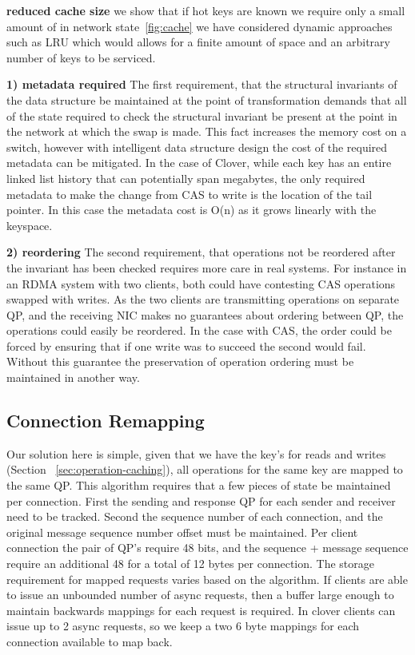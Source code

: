 \textbf{reduced cache size} we show that if hot keys are known we require only a
small amount of in network state~\ref{fig:cache} we have considered dynamic
approaches such as LRU which would allows for a finite amount of space and an
arbitrary number of keys to be serviced.

 

\textbf{1) metadata required} The first requirement, that the structural invariants
of the data structure be maintained at the point of transformation demands that
all of the state required to check the structural invariant be present at the
point in the network at which the swap is made. This fact increases the memory
cost on a switch, however with intelligent data structure design the cost of the
required metadata can be mitigated. In the case of Clover, while each key has
an entire linked list history that can potentially span megabytes, the only
required metadata to make the change from CAS to write is the location of the
tail pointer. In this case the metadata cost is O(n) as it grows linearly with
the keyspace.

\textbf{2) reordering} The second requirement, that operations not be reordered
after the invariant has been checked requires more care in real systems. For
instance in an RDMA system with two clients, both could have contesting CAS
operations swapped with writes. As the two clients are transmitting operations on
separate QP, and the receiving NIC makes no guarantees about ordering between QP,
the operations could easily be reordered. In the case with CAS, the order could
be forced by ensuring that if one write was to succeed the second would fail.
Without this guarantee the preservation of operation ordering must be maintained
in another way.

\subsection{Connection Remapping}


Our solution here is simple, given that we have the key's for reads and writes
(Section ~\ref{sec:operation-caching}), all operations for the same key are
mapped to the same QP.  This algorithm requires that a few pieces of state be
maintained per connection.  First the sending and response QP for each sender
and receiver need to be tracked. Second the sequence number of each connection,
and the original message sequence number offset must be maintained. Per client
connection the pair of QP's require 48 bits, and the sequence + message sequence
require an additional 48 for a total of 12 bytes per connection. The storage
requirement for mapped requests varies based on the algorithm. If clients are
able to issue an unbounded number of async requests, then a buffer large enough
to maintain backwards mappings for each request is required. In clover clients
can issue up to 2 async requests, so we keep a two 6 byte mappings for each
connection available to map back. 


